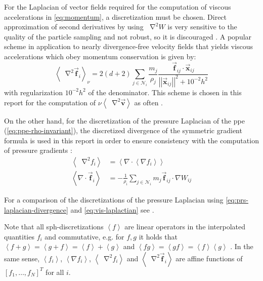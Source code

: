 \documentclass[conference]{IEEEtran}
\newcommand\abss[1]{\left|\left|#1\right|\right|}
\newcommand*\Laplace{\mathop{}\!\mathbin\nabla^2}
\newcommand\vek[1]{\vec{\bm{#1}}}
\newcommand\abr[1]{\left\langle#1\right\rangle}
\newcommand\divergence{{\nabla\cdot}}
\begin{document}
For the Laplacian of vector fields required for the computation of viscous accelerations in \autoref{eq:momentum}, a discretization must be chosen. Direct approximation of second derivatives by using $\Laplace W$ is very sensitive to the quality of the particle sampling and not robust, so it is discouraged \autocites{price2012}. A popular scheme in application to nearly divergence-free velocity fields that yields viscous accelerations which obey momentum conservation \cite{price2012} is given by:
\begin{equation}\label{eq:vis-laplactian}
  \abr{\Laplace \vek{f}_i}_\nu = 2(d+2) \sum_{j\in\mathcal{N}_i} \frac{m_j}{\rho_j}  \frac{\vek{f}_{ij} \cdot \vek{x}_{ij}}{\abss{\vek{x}_{ij}}^2+10^{-2}h^2}
\end{equation}
with regularization $10^{-2}h^2$ of the denominator. This scheme is chosen in this report for the computation of $\nu \abr{\Laplace \vek{v}}$ as often \autocite[recommended]{survey2022}.

On the other hand, for the discretization of the pressure Laplacian of the \ac{ppe} (\autoref{eq:ppe-rho-invariant}), the discretized divergence of the symmetric gradient formula is used in this report in order to ensure consistency with the computation of pressure gradients \cite{2014-survey}:
\begin{equation}
\begin{aligned}\label{eq:prs-laplacian-divergence}
  \abr{\Laplace f_i} &= \abr{\divergence \abr{\nabla f_i}}\\
  \abr{\divergence \vek{f}_i} &= -\frac{1}{\rho_i} \sum_{j\in\mathcal{N}_i} m_j \vek{f}_{ij} \cdot \nabla W_{ij}
\end{aligned}
\end{equation}

For a comparison of the discretizations of the pressure Laplacian using \autoref{eq:prs-laplacian-divergence} and \autoref{eq:vis-laplactian} see \autocite[Fürstenau et al.]{fuesrtenau-laplacian-comp}.


Note that all \ac{sph}-discretizations $\abr{f}$ are linear operators in the interpolated quantities $f_i$ and commutative, e.g. for $f,g$ it holds that $\abr{f + g} = \abr{g + f} = \abr{f} + \abr{g}$ and $\abr{f  g} = \abr{g  f} = \abr{f}  \abr{g}$ \cite{liu2010}. In the same sense, $\abr{f_i}$, $\abr{\nabla f_i}$, $\abr{\Laplace f_i}$ and  $\abr{\Laplace \vek{f}_i}$ are affine functions of $[f_1, \dots, f_N]^T$ for all $i$.
\end{document}
